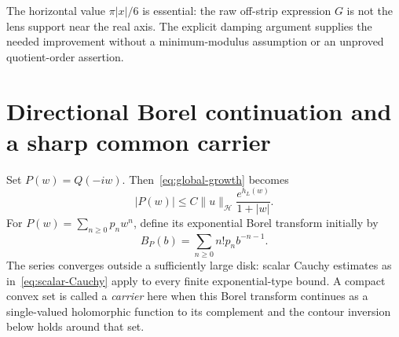 \documentclass[11pt,a4paper]{article}
\numberwithin{equation}{section}
\theoremstyle{definition}
\theoremstyle{remark}
\newcommand{\Hh}{\mathcal H}
\newcommand{\norm}[1]{\lVert #1\rVert}
\begin{document}
The horizontal value $\pi|x|/6$ is essential: the raw off-strip expression $G$ is not the lens support near the real axis. The explicit damping argument supplies the needed improvement without a minimum-modulus assumption or an unproved quotient-order assertion.

\section{Directional Borel continuation and a sharp common carrier}\label{sec:Borel}

Set $P(w)=Q(-iw)$. Then~\eqref{eq:global-growth} becomes
\begin{equation}\label{eq:P-growth}
 |P(w)|\le C\norm{u}_{\Hh}\frac{e^{h_L(w)}}{1+|w|}.
\end{equation}
For $P(w)=\sum_{n\ge0}p_nw^n$, define its exponential Borel transform initially by
\begin{equation}\label{eq:B-series}
 B_P(b)=\sum_{n\ge0}n!p_n b^{-n-1}.
\end{equation}
The series converges outside a sufficiently large disk: scalar Cauchy estimates as in~\eqref{eq:scalar-Cauchy} apply to every finite exponential-type bound. A compact convex set is called a \emph{carrier} here when this Borel transform continues as a single-valued holomorphic function to its complement and the contour inversion below holds around that set.
\end{document}
